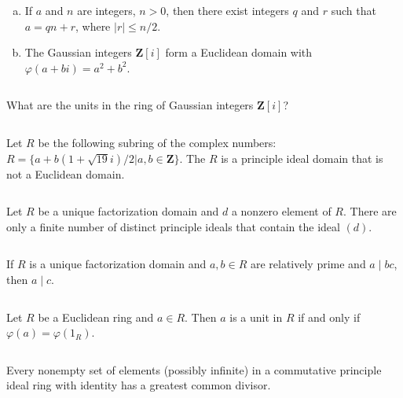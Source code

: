 $$ $$

\begin{ex}
    \begin{enumerate}[(a)]
        \item If $a$ and $n$ are integers, $n>0$, then there exist integers $q$ and $r$ such that $a=qn+r$, where $\left| r \right| \leq n /2$.
        \item The Gaussian integers $\mathbf{Z}[i]$ form a Euclidean domain with $\varphi(a+bi)=a^{2}+b^{2}$.
    \end{enumerate}
\end{ex}

$$ $$

\begin{ex}
    What are the units in the ring of Gaussian integers $\mathbf{Z}[i]$?
\end{ex}

$$ $$

\begin{ex}
    Let $R$ be the following subring of the complex numbers: $R=\{a+b(1+\sqrt{19}i) /2|a,b\in \mathbf{Z}\}$. The $R$ is a principle ideal domain that is not a Euclidean domain.
\end{ex}

$$ $$

\begin{ex}
    Let $R$ be a unique factorization domain and $d$ a nonzero element of $R$. There are only a finite number of distinct principle ideals that contain the ideal $(d)$.
\end{ex}

$$ $$

\begin{ex}
    If $R$ is a unique factorization domain and $a,b\in R$ are relatively prime and $a\mid bc$, then $a\mid c$.
\end{ex}

$$ $$

\begin{ex}
    Let $R$ be a Euclidean ring and $a\in R$. Then $a$ is a unit in $R$ if and only if $\varphi(a)=\varphi(1_{R})$.
\end{ex}

$$ $$

\begin{ex}
    Every nonempty set of elements (possibly infinite) in a commutative principle ideal ring with identity has a greatest common divisor.
\end{ex}

$$ $$

